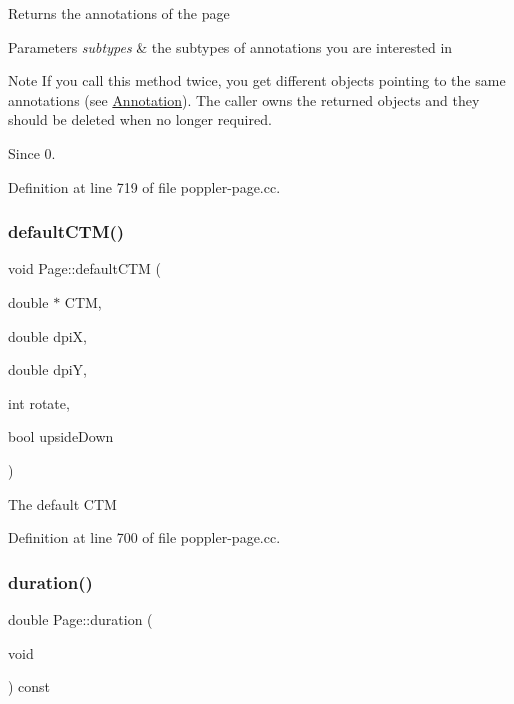Returns the annotations of the page


\begin{DoxyParams}{Parameters}
{\em subtypes} & the subtypes of annotations you are interested in\\
\hline
\end{DoxyParams}
\begin{DoxyNote}{Note}
If you call this method twice, you get different objects pointing to the same annotations (see \hyperlink{class_poppler_1_1_annotation}{Annotation}). The caller owns the returned objects and they should be deleted when no longer required.
\end{DoxyNote}
\begin{DoxySince}{Since}
0. 
\end{DoxySince}


Definition at line 719 of file poppler-\/page.\+cc.

\mbox{\label{class_poppler_1_1_page_a5028c2c7b89bcba5124d12f3c8de95ba}} 
\subsubsection{\texorpdfstring{default\+C\+T\+M()}{defaultCTM()}}
{\footnotesize\ttfamily void Page\+::default\+C\+TM (\begin{DoxyParamCaption}\item[{double $\ast$}]{C\+TM,  }\item[{double}]{dpiX,  }\item[{double}]{dpiY,  }\item[{int}]{rotate,  }\item[{bool}]{upside\+Down }\end{DoxyParamCaption})}

The default C\+TM 

Definition at line 700 of file poppler-\/page.\+cc.

\mbox{\label{class_poppler_1_1_page_a7acb7886f86577c4abd5a32c794d36f8}} 
\subsubsection{\texorpdfstring{duration()}{duration()}}
{\footnotesize\ttfamily double Page\+::duration (\begin{DoxyParamCaption}\item[{void}]{ }\end{DoxyParamCaption}) const}

